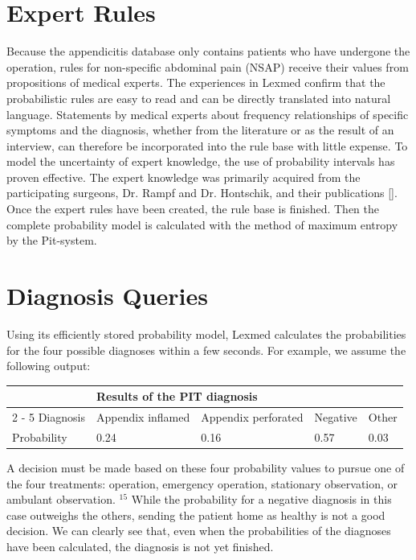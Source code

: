 \documentclass[10pt]{book}
\begin{document}
\section{Expert Rules}
Because the appendicitis database only contains patients who have undergone the operation, rules for non-specific abdominal pain (NSAP) receive their values from propositions of medical experts. The experiences in Lexmed confirm that the probabilistic rules are easy to read and can be directly translated into natural language. Statements by medical experts about frequency relationships of specific symptoms and the diagnosis, whether from the literature or as the result of an interview, can therefore be incorporated into the rule base with little expense. To model the uncertainty of expert knowledge, the use of probability intervals has proven effective. The expert knowledge was primarily acquired from the participating surgeons, Dr. Rampf and Dr. Hontschik, and their publications [\cite{hon94}].
Once the expert rules have been created, the rule base is finished. Then the complete probability model is calculated with the method of maximum entropy by the Pit-system.

\section{Diagnosis Queries}
Using its efficiently stored probability model, Lexmed calculates the probabilities for the four possible diagnoses within a few seconds. For example, we assume the following output:

\begin{center}
\begin{tabular}{lllll}
\hline
 & \multicolumn{4}{l}{Results of the PIT diagnosis} \\
\cline{ 2 - 5 }
Diagnosis & Appendix inflamed & Appendix perforated & Negative & Other \\
\hline
Probability & 0.24 & 0.16 & 0.57 & 0.03 \\
\hline
\end{tabular}
\end{center}

A decision must be made based on these four probability values to pursue one of the four treatments: operation, emergency operation, stationary observation, or ambulant observation. ${ }^{15}$ While the probability for a negative diagnosis in this case outweighs the others, sending the patient home as healthy is not a good decision. We can clearly see that, even when the probabilities of the diagnoses have been calculated, the diagnosis is not yet finished.
\end{document}
